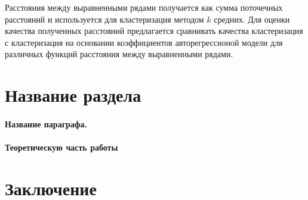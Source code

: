 \documentclass[12pt,twoside]{article}
\begin{document}
        Расстояния между выравненными рядами получается как сумма поточечных расстояний и используется для кластеризация методом $k$\- средних.
        Для оценки качества полученных расстояний предлагается сравнивать качества кластеризация с кластеризация на основании коэффициентов авторегрессионой модели для различных функций расстояния между выравненными рядами.
        

    \section{Название раздела}
    \paragraph{Название параграфа.}
    \paragraph{Теоретическую часть работы}
    \section{Заключение}

     
    
    
    
\end{document}
